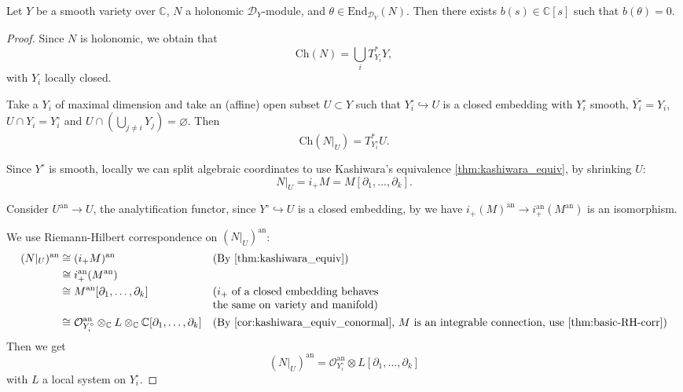 \begin{lemma}\label{lemma 8.5}
    Let $Y$ be a smooth variety over $\mathbb{C}$, $N$ a holonomic $\mathcal{D}_Y$-module, and $\theta\in \mathrm{End}_{\mathcal{D}_Y}(N)$. Then there exists $b(s)\in\mathbb{C}[s]$ such that $b(\theta)=0$.
\end{lemma}
\begin{proof}
    Since $N$ is holonomic, we obtain that
    \[
        \mathrm{Ch}(N) = \bigcup_{i} T^*_{Y_i} Y,
    \]
    with $Y_{i}$ locally closed.

    Take a $Y_i$ of maximal dimension and take an (affine) open subset $U \subset Y$
    such that $Y_{i}^{\circ} \hookrightarrow U$ is a closed embedding
    with $Y_{i}^{\circ}$ smooth, $\overline{Y_i^{\circ}} = Y_{i}$, $U \cap Y_i = Y_i^\circ$
    and $U \cap (\bigcup_{j\neq i}Y_j) = \varnothing$. Then
    \[
        \mathrm{Ch}(N|_U) = T^*_{Y_i^\circ} U.
    \]

    Since $Y^\circ$ is smooth, locally we can split algebraic coordinates to use Kashiwara's equivalence \ref{thm:kashiwara_equiv}, by shrinking $U$:
    \[
        N|_U = i_{+}M = M[\partial_1, \ldots, \partial_k].
    \]

    Consider $U^{\mathrm{an}} \to U$, the analytification functor, since $Y^\circ \hookrightarrow U$ is a closed embedding,
    by \cite[Proposition~4.7.2.(ii)]{hotta2008d} we have $i_{+}(M)^{\mathrm{an}} \to i^{\mathrm{an}}_{+}(M^{\mathrm{an}})$ is an isomorphism.

    We use Riemann-Hilbert correspondence on $(N|_U)^{\mathrm{an}}$:
    \begin{align*}
        (N|_U)^{\mathrm{an}} & \cong (i_{+}M)^{\mathrm{an}}                                                                                                       &  & \text{(By \ref{thm:kashiwara_equiv})}                                                                                   \\
                             & \cong i^{\mathrm{an}}_{+}(M^{\mathrm{an}})                                                                                                                                                                                                                      \\
                             & \cong M^{\mathrm{an}}[\partial_1, \ldots, \partial_k]                                                                              &  & \text{\begin{tabular}[t]{@{}l@{}}($i_+$ of a closed embedding behaves\\ the same on variety and manifold)\end{tabular}} \\
                             & \cong \mathcal{O}^{\mathrm{an}}_{Y_i^\circ} \otimes_{\mathbb{C}} L \otimes_{\mathbb{C}} \mathbb{C}[\partial_1, \ldots, \partial_k] &  & \text{(By \ref{cor:kashiwara_equiv_conormal}, $M$ is an integrable connection, use \ref{thm:basic-RH-corr})}
    \end{align*}
    Then we get
    \[
        (N|_U)^{\mathrm{an}} = \mathcal{O}^{\mathrm{an}}_{Y_i^\circ} \otimes L[\partial_1, \ldots, \partial_k]
    \]
    with $L$ a local system on $Y_i^\circ$.


\end{proof}
